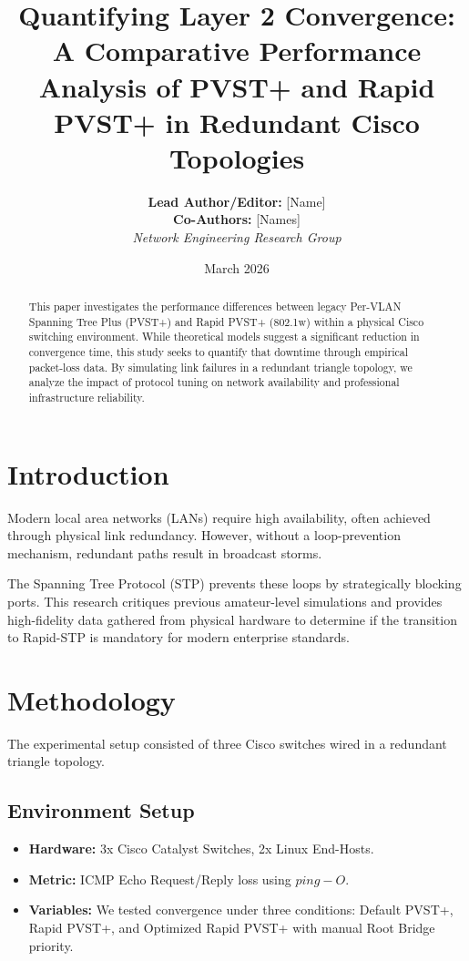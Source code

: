 \documentclass[12pt]{article}
\title{\textbf{Quantifying Layer 2 Convergence: A Comparative Performance Analysis of PVST+ and Rapid PVST+ in Redundant Cisco Topologies}}
\author{
    \textbf{Lead Author/Editor:} [Name] \\
    \textbf{Co-Authors:} [Names] \\
    \textit{Network Engineering Research Group}
}
\date{March 2026}
\begin{document}
\maketitle

\begin{abstract}
This paper investigates the performance differences between legacy Per-VLAN Spanning Tree Plus (PVST+) and Rapid PVST+ (802.1w) within a physical Cisco switching environment. While theoretical models suggest a significant reduction in convergence time, this study seeks to quantify that downtime through empirical packet-loss data. By simulating link failures in a redundant triangle topology, we analyze the impact of protocol tuning on network availability and professional infrastructure reliability.
\end{abstract}

\section{Introduction}
Modern local area networks (LANs) require high availability, often achieved through physical link redundancy. However, without a loop-prevention mechanism, redundant paths result in broadcast storms. 



The Spanning Tree Protocol (STP) prevents these loops by strategically blocking ports. This research critiques previous amateur-level simulations and provides high-fidelity data gathered from physical hardware to determine if the transition to Rapid-STP is mandatory for modern enterprise standards.

\section{Methodology}
The experimental setup consisted of three Cisco switches wired in a redundant triangle topology. 



\subsection{Environment Setup}
\begin{itemize}
    \item \textbf{Hardware:} 3x Cisco Catalyst Switches, 2x Linux End-Hosts.
    \item \textbf{Metric:} ICMP Echo Request/Reply loss using $ping -O$.
    \item \textbf{Variables:} We tested convergence under three conditions: Default PVST+, Rapid PVST+, and Optimized Rapid PVST+ with manual Root Bridge priority.
\end{itemize}
\end{document}

